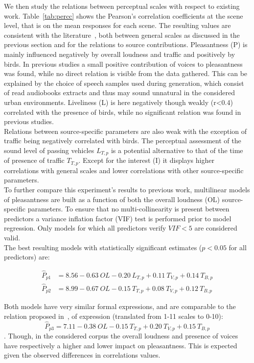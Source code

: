 \documentclass[11pt,a4paper]{article}
\begin{document}
We then study the relations between perceptual scales with respect to existing work. Table~\ref{tab:percc} shows the Pearson's correlation coefficients at the scene level, that is on the mean responses for each scene. The resulting values are consistent with the literature~\cite{aumond, lavandier}, both between general scales as discussed in the previous section and for the relations to source contributions. Pleasantness (P) is mainly influenced negatively by overall loudness and traffic and positively by birds. In previous studies a small positive contribution of voices to pleasantness was found, while no direct relation is visible from the data gathered. This can be explained by the choice of speech samples used during generation, which consist of read audiobooks extracts and thus may sound unnatural in the considered urban environments. Liveliness (L) is here negatively though weakly (r<0.4) correlated with the presence of birds, while no significant relation was found in previous studies.\\

Relations between source-specific parameters are also weak with the exception of traffic being negatively correlated with birds. The perceptual assessment of the sound level of passing vehicles $L_{T, p}$ is a potential alternative to that of the time of presence of traffic $T_{T, p}$. Except for the interest (I) it displays higher correlations with general scales and lower correlations with other source-specific parameters.\\

To further compare this experiment's results to previous work, multilinear models of pleasantness are built as a function of both the overall loudness (OL) source-specific parameters. To ensure that no multi-collinearity is present between predictors a variance inflation factor (VIF) test is performed prior to model regression. Only models for which all predictors verify $VIF<5$ are considered valid.\\

The best resulting models with statistically significant estimates ($p<0.05$ for all predictors) are:

\begin{align}
\hat P_{p1} &= 8.56 - 0.63~OL - 0.20~L_{T, p} + 0.11~T_{V, p} + 0.14~T_{B, p}\\
\hat P_{p2} &= 8.99 - 0.67~OL - 0.15~T_{T, p} + 0.08~T_{V, p} + 0.12~T_{B, p}
\end{align}

Both models have very similar formal expressions, and are comparable to the relation proposed in~\cite{ricciardi2014}, of expression (translated from 1-11 scales to 0-10):
\begin{equation}
\hat P_{p3} = 7.11 - 0.38~OL - 0.15~T_{T, p} + 0.20~T_{V, p} + 0.15~T_{B, p}
\end{equation}.
Though, in the considered corpus the overall loudness and presence of voices have respectively a higher and lower impact on pleasantness. This is expected given the observed differences in correlations values.\\
\end{document}
